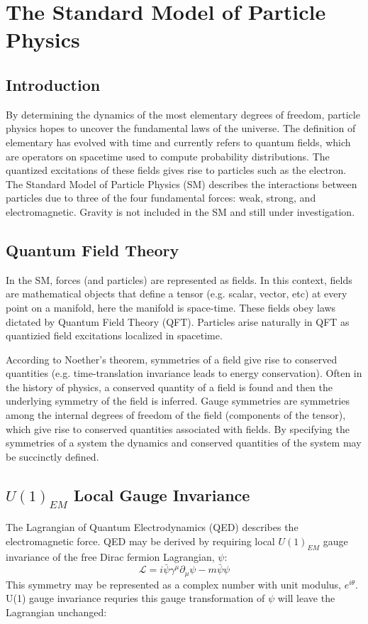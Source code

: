 
\label{ch:theory}
\chapter{The Standard Model of Particle Physics}
\label{SM chapter}
\section{Introduction}
By determining the dynamics of the most elementary degrees of freedom, particle physics hopes to uncover the fundamental laws of the universe. The definition of elementary has evolved with time and currently refers to quantum fields, which are operators on spacetime used to compute probability distributions. The quantized excitations of these fields gives rise to particles such as the electron. The Standard Model of Particle Physics (SM) describes the interactions between particles due to three of the four fundamental forces: weak, strong, and electromagnetic. Gravity is not included in the SM and still under investigation. 
\section{Quantum Field Theory}
In the SM, forces (and particles) are represented as fields. In this context, fields are mathematical objects that define a tensor (e.g. scalar, vector, etc)  at every point on a manifold, here the manifold is space-time. These fields obey laws dictated by Quantum Field Theory (QFT). Particles arise naturally in QFT as quantizied field excitations localized in spacetime. 

According to Noether's theorem, symmetries of a field give rise to conserved quantities (e.g. time-translation invariance leads to energy conservation).  Often in the history of physics, a conserved quantity of a field is found and then the underlying symmetry of the field is inferred. Gauge symmetries are symmetries among the internal degrees of freedom of the field (components of the tensor), which give rise to conserved quantities associated with fields. By specifying the symmetries of a system the dynamics and conserved quantities of the system may be succinctly defined.
\section{$U(1)_{EM}$ Local Gauge Invariance}
The Lagrangian of Quantum Electrodynamics (QED) describes the electromagnetic force. QED may be derived by requiring local $U(1)_{EM}$ gauge invariance of the free Dirac fermion Lagrangian, $\psi$:
\begin{equation}
\mathcal{L} = i\bar{\psi}\gamma^{\mu}\partial_{\mu}\psi - m\bar{\psi}{\psi}
\end{equation}
This symmetry may be represented as a complex number with unit modulus, $e^{i\theta}$. U(1) gauge invariance requries this gauge transformation of $\psi$ will leave the Lagrangian unchanged:

